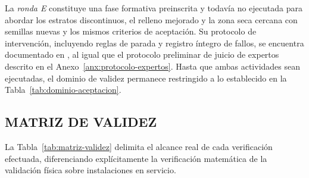 La \emph{ronda E} constituye una fase formativa preinscrita y todavía no ejecutada para abordar los estratos discontinuos, el relleno mejorado y la zona seca cercana con semillas nuevas y los mismos criterios de aceptación. Su protocolo de intervención, incluyendo reglas de parada y registro íntegro de fallos, se encuentra documentado en , al igual que el protocolo preliminar de juicio de expertos descrito en el Anexo~\ref{anx:protocolo-expertos}. Hasta que ambas actividades sean ejecutadas, el dominio de validez permanece restringido a lo establecido en la Tabla~\ref{tab:dominio-aceptacion}.

\subsection{MATRIZ DE VALIDEZ}
\label{sec:matriz-validez}

La Tabla~\ref{tab:matriz-validez} delimita el alcance real de cada verificación efectuada, diferenciando explícitamente la verificación matemática de la validación física sobre instalaciones en servicio.

